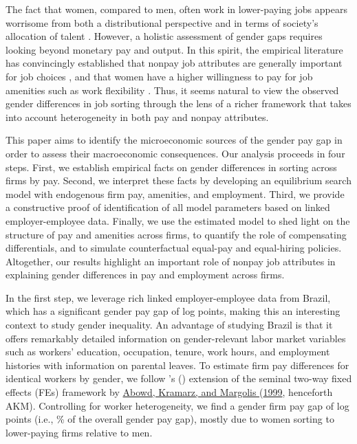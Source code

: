 
The fact that women, compared to men, often work in lower-paying jobs appears worrisome from both a distributional perspective and in terms of society's allocation of talent \citep{HsiehHurstJonesKlenow2019}. However, a holistic assessment of gender gaps requires looking beyond monetary pay and output. In this spirit, the empirical literature has convincingly established that nonpay job attributes are generally important for job choices \citep{HallMueller2018}, and that women have a higher willingness to pay for job amenities such as work flexibility \citep{Goldin2014}. Thus, it seems natural to view the observed gender differences in job sorting through the lens of a richer framework that takes into account heterogeneity in both pay and nonpay attributes.

This paper aims to identify the microeconomic sources of the gender pay gap in order to assess their macroeconomic consequences. Our analysis proceeds in four steps. %
%
First, we establish empirical facts on gender differences in sorting across firms by pay. %
%
Second, we interpret these facts by developing an equilibrium search model with endogenous firm pay, amenities, and employment. %
%
Third, we provide a constructive proof of identification of all model parameters based on linked employer-employee data. %
%
Finally, we use the estimated model to shed light on the structure of pay and amenities across firms, to quantify the role of compensating differentials, and to simulate counterfactual equal-pay and equal-hiring policies. %
%
Altogether, our results highlight an important role of nonpay job attributes in explaining gender differences in pay and employment across firms.

In the first step, we leverage rich linked employer-employee data from Brazil, which has a significant gender pay gap of  log points, making this an interesting context to study gender inequality. An advantage of studying Brazil is that it offers remarkably detailed information on gender-relevant labor market variables such as workers' education, occupation, tenure, work hours, and employment histories with information on parental leaves. %
%
To estimate firm pay differences for identical workers by gender, we follow \citeauthor{CardCardosoKline2016}'s (\citeyear{CardCardosoKline2016}) extension of the seminal two-way fixed effects (FEs) framework by \hyperref[sec:bib]{Abowd, Kramarz, and Margolis }(\hyperref[sec:bib]{1999}, henceforth AKM). %
%
Controlling for worker heterogeneity, we find a gender firm pay gap of  log points (i.e., \% of the overall gender pay gap), mostly due to women sorting to lower-paying firms relative to men.

